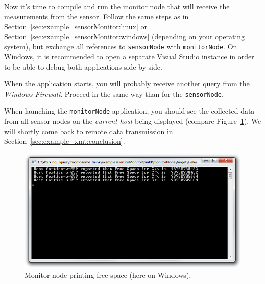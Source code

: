 Now it's time to compile and run the monitor node that will receive the measurements from the sensor.
Follow the same steps as in Section~\ref{sec:example_sensorMonitor:linux} or Section~\ref{sec:example_sensorMonitor:windows}
(depending on your operating system), but exchange all references to \verb|sensorNode| with \verb|monitorNode|.
On Windows, it is recommended to open a separate Visual Studio instance in order to be able to debug both applications side by side.

When the application starts, you will probably receive another query from the \emph{Windows Firewall}.
Proceed in the same way than for the \verb|sensorNode|.

When launching the \verb|monitorNode| application, you should see the collected data from all sensor nodes on the \emph{current host} being displayed
(compare Figure~\ref{fig:example_monitorNode}).
%
We will shortly come back to remote data transmission in Section~\ref{sec:example_xmt:conclusion}.

\begin{figure}[htpb]
	\centering
	\includegraphics[scale=0.75]{figures/example_monitorNode.png}
	\caption{Monitor node printing free space (here on Windows).}
	\label{fig:example_monitorNode}
\end{figure}
